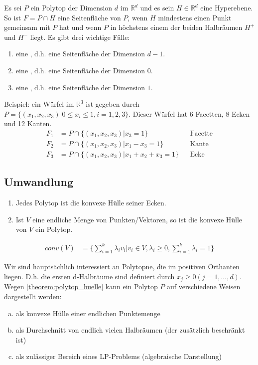 Es sei $P$ ein Polytop der Dimension $d$ im $\mathbb R^d$ und es sein $H \in \mathbb R^d$ eine Hyperebene. So ist $F = P \cap H$ eine Seitenfläche von $P$, wenn $H$ mindestens einen Punkt gemeinsam mit $P$ hat und wenn $P$ in höchstens einem der beiden Halbräumen $H^{+}$ und $H^{-}$ liegt. Es gibt drei wichtige Fälle:
\begin{enumerate}
\item eine , d.h. eine Seitenfläche der Dimension $d-1$.
\item eine , d.h. eine Seitenfläche der Dimension $0$.
\item eine , d.h. eine Seitenfläche der Dimension $1$.
\end{enumerate}
Beispiel: ein Würfel im $\mathbb R^3$ ist gegeben durch $P = \{(x_1,x_2,x_3) | 0 \leq x_i \leq 1, i=1,2,3\}$. Dieser Würfel hat 6 Facetten, 8 Ecken und 12 Kanten.
\begin{align*}
F_1 &= P \cap \{(x_1,x_2,x_3) | x_3 = 1 \} && \text{Facette} \\
F_2 &= P \cap \{(x_1,x_2,x_3) | x_1 - x_3 = 1 \} && \text{Kante} \\
F_3 &= P \cap \{(x_1,x_2,x_3) | x_1 + x_2 + x_3 = 1 \} && \text{Ecke}
\end{align*}
\subsection{Umwandlung}
\begin{theorem}
\label{theorem:polytop_huelle}
\begin{enumerate}
\item Jedes Polytop ist die konvexe Hülle seiner Ecken.
\item Ist $V$ eine endliche Menge von Punkten/Vektoren, so ist die konvexe Hülle von $V$ ein Polytop.
\end{enumerate}
\end{theorem}
\begin{definition}
\begin{align*}
conv(V) &= \Big \{ \sum_{i=1}^k \lambda_i v_i \Big | v_i \in V, \lambda_i \geq 0, \sum_{i=1}^k \lambda_i = 1 \Big \}
\end{align*}
\end{definition}
Wir sind hauptsächlich interessiert an Polytopne, die im positiven Orthanten liegen.
D.h. die ersten d-Halbräume sind definiert durch $x_j \geq 0 ( j = 1,\dotsc,d)$.
Wegen \ref{theorem:polytop_huelle} kann ein Polytop $P$ auf verschiedene Weisen dargestellt werden:
\begin{enumerate}[a)]
\item als konvexe Hülle einer endlichen Punktemenge
\item als Durchschnitt von endlich vielen Halbräumen (der zusätzlich beschränkt ist)
\item als zulässiger Bereich eines LP-Problems (algebraische Darstellung)
\end{enumerate}
